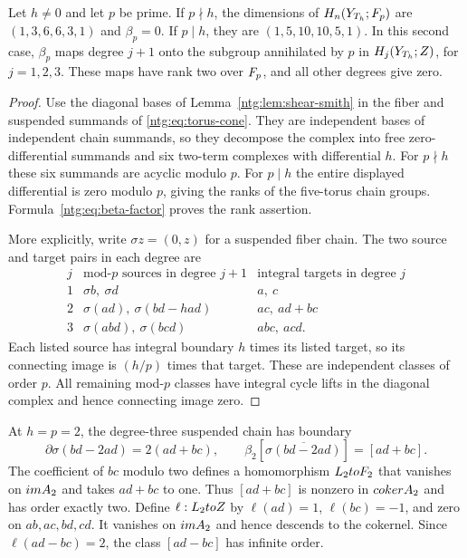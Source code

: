 \begin{proposition}\label{ntg:prop:shear-beta}
Let $h\ne0$ and let $p$ be prime. If $p\nmid h$, the dimensions
of $H_n(Y_{T_h};F_p)$ are $(1,3,6,6,3,1)$ and $\beta_p=0$.
If $p\mid h$, they are $(1,5,10,10,5,1)$.
In this second case, $\beta_p$ maps degree $j+1$ onto the subgroup
annihilated by $p$ in $H_j(Y_{T_h};Z)$, for $j=1,2,3$.
These maps have rank two over $F_p$, and all other degrees give zero.
\end{proposition}

\begin{proof}
Use the diagonal bases of Lemma~\ref{ntg:lem:shear-smith} in the fiber
and suspended summands of \eqref{ntg:eq:torus-cone}. They are independent
bases of independent chain summands, so they decompose the complex
into free zero-differential summands and six two-term complexes with
differential $h$. For $p\nmid h$ these six summands are acyclic
modulo $p$. For $p\mid h$ the entire displayed differential is zero
modulo $p$, giving the ranks of the five-torus chain groups.
Formula~\eqref{ntg:eq:beta-factor} proves the rank assertion.

More
explicitly, write $\sigma z=(0,z)$ for a suspended fiber chain.
The two source and target pairs in each degree are
\begin{equation}\label{ntg:eq:explicit-beta}
\begin{array}{c|c|c}
 j&\text{mod-$p$ sources in degree }j+1&
       \text{integral targets in degree }j\\ \hline
 1&\sigma b,\ \sigma d&a,\ c\\
 2&\sigma(ad),\ \sigma(bd-had)&ac,\ ad+bc\\
 3&\sigma(abd),\ \sigma(bcd)&abc,\ acd.
\end{array}
\end{equation}
Each listed source has integral boundary $h$ times its listed
target, so its connecting image is $(h/p)$ times that target.
These are independent classes of order $p$. All remaining
mod-$p$ classes have integral cycle lifts in the diagonal complex
and hence connecting image zero.
\end{proof}

At $h=p=2$, the degree-three suspended chain has boundary
\[
 \partial\sigma(bd-2ad)=2(ad+bc),\qquad
 \beta_2[\overline{\sigma(bd-2ad)}]=[ad+bc].
\]
The coefficient of $bc$ modulo two defines a homomorphism
$L_2toF_2$ that vanishes on $im A_2$ and takes $ad+bc$ to one.
Thus $[ad+bc]$ is nonzero in $coker A_2$ and has order exactly two.
Define $\ell:L_2toZ$ by
$\ell(ad)=1$, $\ell(bc)=-1$, and zero on $ab,ac,bd,cd$.
It vanishes on $im A_2$ and hence descends to the cokernel.
Since $\ell(ad-bc)=2$, the class $[ad-bc]$ has infinite order.

